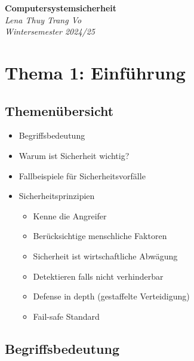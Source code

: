 \documentclass[a4paper, 10pt]{article}
\begin{document}
\begin{titlepage}
    \centering
    \vspace*{3cm}
    {\Huge \textbf{Computersystemsicherheit}}\\[1.5cm]
    {\large \textit{Lena Thuy Trang Vo}}\\[0.5cm]
    {\large \textit{Wintersemester 2024/25}}\\[2cm]

    \vfill
\end{titlepage}

\tableofcontents
\newpage

\section{Thema 1: Einführung}
\subsection{Themenübersicht}
\begin{itemize}
    \item Begriffsbedeutung
    \item Warum ist Sicherheit wichtig?
    \item Fallbeispiele für Sicherheitsvorfälle
    \item Sicherheitsprinzipien
    \begin{itemize}
        \item Kenne die Angreifer 
        \item Berücksichtige menschliche Faktoren
        \item Sicherheit ist wirtschaftliche Abwägung 
        \item Detektieren falls nicht verhinderbar
        \item Defense in depth (gestaffelte Verteidigung)
        \item Fail-safe Standard
    \end{itemize}
\end{itemize}
\subsection{Begriffsbedeutung}
\end{document}
